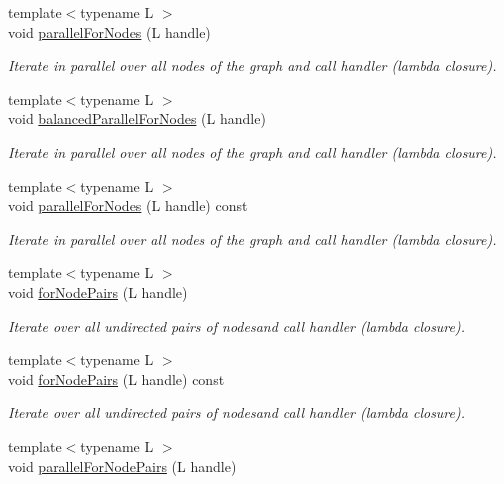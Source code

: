 \begin{DoxyCompactItemize}
{\footnotesize template$<$typename L $>$ }\\void \hyperlink{class_networ_kit_1_1_graph_a8633f553d0f134474f248e94faf3064d}{parallel\-For\-Nodes} (L handle)
\begin{DoxyCompactList}\small\item\em Iterate in parallel over all nodes of the graph and call handler (lambda closure). \end{DoxyCompactList}\item 
{\footnotesize template$<$typename L $>$ }\\void \hyperlink{class_networ_kit_1_1_graph_a72e5787ce9f3016853cbdde0f961d570}{balanced\-Parallel\-For\-Nodes} (L handle)
\begin{DoxyCompactList}\small\item\em Iterate in parallel over all nodes of the graph and call handler (lambda closure). \end{DoxyCompactList}\item 
{\footnotesize template$<$typename L $>$ }\\void \hyperlink{class_networ_kit_1_1_graph_acd5d60cd2eda52401fe660e172185e01}{parallel\-For\-Nodes} (L handle) const 
\begin{DoxyCompactList}\small\item\em Iterate in parallel over all nodes of the graph and call handler (lambda closure). \end{DoxyCompactList}\item 
{\footnotesize template$<$typename L $>$ }\\void \hyperlink{class_networ_kit_1_1_graph_a498eb0beb05b992d12b246fcf3b76070}{for\-Node\-Pairs} (L handle)
\begin{DoxyCompactList}\small\item\em Iterate over all undirected pairs of nodesand call handler (lambda closure). \end{DoxyCompactList}\item 
{\footnotesize template$<$typename L $>$ }\\void \hyperlink{class_networ_kit_1_1_graph_a4d313c86d4fdb03af369ed33c2d66e02}{for\-Node\-Pairs} (L handle) const 
\begin{DoxyCompactList}\small\item\em Iterate over all undirected pairs of nodesand call handler (lambda closure). \end{DoxyCompactList}\item 
{\footnotesize template$<$typename L $>$ }\\void \hyperlink{class_networ_kit_1_1_graph_a7b7ce5c377baf11553e700dbe76cfba5}{parallel\-For\-Node\-Pairs} (L handle)

\end{DoxyCompactItemize}
